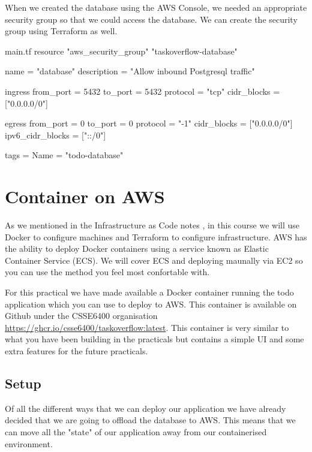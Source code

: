 \documentclass{csse4400}
\begin{document}
When we created the database using the AWS Console,
we needed an appropriate security group so that we could access the database.
We can create the security group using Terraform as well.

\begin{code}[language=terraform,numbers=none]{main.tf}
resource "aws_security_group" "taskoverflow-database" {
  name        = "database"
  description = "Allow inbound Postgresql traffic"

  ingress {
    from_port        = 5432
    to_port          = 5432
    protocol         = "tcp"
    cidr_blocks      = ["0.0.0.0/0"]
  }

  egress {
    from_port        = 0
    to_port          = 0
    protocol         = "-1"
    cidr_blocks      = ["0.0.0.0/0"]
    ipv6_cidr_blocks = ["::/0"]
  }

  tags = {
    Name = "todo-database"
  }
}
\end{code}


\section{Container on AWS}

As we mentioned in the Infrastructure as Code notes \cite{iac-notes},
in this course we will use Docker to configure machines and Terraform to configure infrastructure.
AWS has the ability to deploy Docker containers using a service known as Elastic Container Service (ECS). We will cover ECS and deploying maunally via EC2 so you can use the method you feel most confortable with.

For this practical we have made available a Docker container running the todo application which you can use to deploy to AWS. This container is available on Github under the CSSE6400 organisation \url{https://ghcr.io/csse6400/taskoverflow:latest}. This container is very similar to what you have been building in the practicals but contains a simple UI and some extra features for the future practicals.

\subsection{Setup}

Of all the different ways that we can deploy our application we have already decided that we are going to offload the database to AWS. This means that we can move all the "state" of our application away from our containerised environment.
\end{document}
